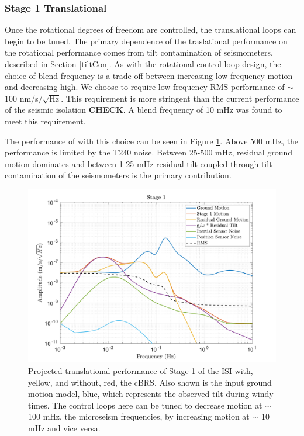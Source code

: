 \documentclass [12pt, proquest]{uwthesis}[2019]
\begin{document}
\subsubsection{Stage 1 Translational}

Once the rotational degrees of freedom are controlled, the translational loops can begin to be tuned. The primary dependence of the traslational performance on the rotational performance comes from tilt contamination of seismometers, described in Section \ref{tiltCon}. As with the rotational control loop design, the choice of blend frequency is a trade off between increasing low frequency motion and decreasing high. We choose to require low frequency RMS performance of $\sim$ 100 nm/s$/\sqrt{\text{Hz}}$. This requirement is more stringent than the current performance of the seismic isolation \textbf{CHECK}. A blend frequency of 10 mHz was found to meet this requirement.

The performance of with this choice can be seen in Figure \ref{cBRS1X}. Above 500 mHz, the performance is limited by the T240 noise. Between 25-500 mHz, residual ground motion dominates and between 1-25 mHz residual tilt coupled through tilt contamination of the seismometers is the primary contribution. 

\begin{figure}[!h]
\begin{center}
\includegraphics[width=\textwidth]{cBRS_Model_ST1X.pdf}
\caption{Projected translational performance of Stage 1 of the ISI with, yellow, and without, red, the cBRS. Also shown is the input ground motion model, blue, which represents the observed tilt during windy times. The control loops here can be tuned to decrease motion at $\sim$ 100 mHz, the microseism frequencies, by increasing motion at $\sim$ 10 mHz and vice versa.}
\label{cBRS1X}
\end{center}
\end{figure}
\end{document}
